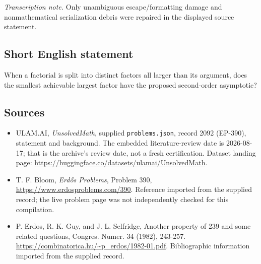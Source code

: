 \documentclass[11pt,a4paper]{article}
\begin{document}
{\small\emph{Transcription note.} Only unambiguous escape/formatting damage and nonmathematical serialization debris were repaired in the displayed source statement.}

\subsection{Short English statement}

When a factorial is split into distinct factors all larger than its argument, does the smallest achievable largest factor have the proposed second-order asymptotic?

\subsection{Sources}

{\small

\begin{itemize}

\item[\hypertarget{source:2092:1}{S1}] ULAM.AI, \emph{UnsolvedMath}, supplied \texttt{problems.json}, record 2092 (EP-390), statement and background. The embedded literature-review date is 2026-08-17; that is the archive’s review date, not a fresh certification. Dataset landing page: \url{https://huggingface.co/datasets/ulamai/UnsolvedMath}.

\item[\hypertarget{source:2092:2}{S2}] T. F. Bloom, \emph{Erdős Problems}, Problem 390, \url{https://www.erdosproblems.com/390}. Reference imported from the supplied record; the live problem page was not independently checked for this compilation.

\item[\hypertarget{source:2092:3}{S3}] P. Erdos, R. K. Guy, and J. L. Selfridge, Another property of 239 and some related questions, Congres. Numer. 34 (1982), 243-257. \url{https://combinatorica.hu/~p_erdos/1982-01.pdf}. Bibliographic information imported from the supplied record.

\end{itemize}

}

\label{end:2092}
\end{document}
